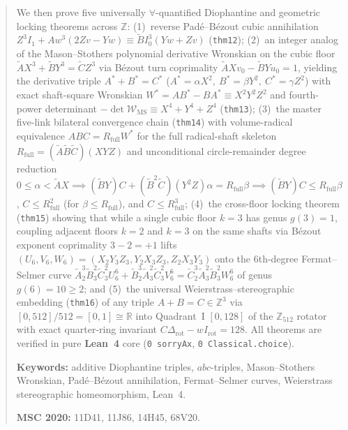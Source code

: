 \documentclass[11pt,a4paper]{article}
\theoremstyle{plain}
\theoremstyle{definition}
\begin{document}
\begin{abstract}
We then prove five universally $\forall$-quantified Diophantine and geometric locking theorems across $\mathbb{Z}$:
(1)~reverse Pad\'e--B\'ezout cubic annihilation $Z^3 I_1 + A w^3(2Zv-Yw) \equiv \widetilde{B} I_0^3(Yw+Zv)$ (\texttt{thm12});
(2)~an integer analog of the Mason--Stothers polynomial derivative Wronskian on the cubic floor $\widetilde{A}X^3+\widetilde{B}Y^3=\widetilde{C}Z^3$ via B\'ezout turn coprimality $\widetilde{A}Xv_0-\widetilde{B}Yu_0=1$, yielding the derivative triple $A^*+B^*=C^*$ ($A^*=\alpha X^2,\ B^*=\beta Y^2,\ C^*=\gamma Z^2$) with exact shaft-square Wronskian $W^* = A B^* - B A^* \equiv X^2 Y^2 Z^2$ and fourth-power determinant $-\det\mathcal{W}_{\mathrm{MS}} \equiv X^4 + Y^4 + Z^4$ (\texttt{thm13});
(3)~the master five-link bilateral convergence chain (\texttt{thm14}) with volume-radical equivalence $A B C = R_{\mathrm{full}} W^*$ for the full radical-shaft skeleton $R_{\mathrm{full}} = (\widetilde{A}\widetilde{B}\widetilde{C})(X Y Z)$ and unconditional circle-remainder degree reduction $0\le\alpha < \widetilde{A}X \implies (\widetilde{B}Y)C + (\widetilde{B}^2\widetilde{C})(Y^2 Z)\alpha = R_{\mathrm{full}}\beta \implies (\widetilde{B}Y)C \le R_{\mathrm{full}}\beta$, $C\le R_{\mathrm{full}}^2$ (for $\beta\le R_{\mathrm{full}}$), and $C\le R_{\mathrm{full}}^3$;
(4)~the cross-floor locking theorem (\texttt{thm15}) showing that while a single cubic floor $k=3$ has genus $g(3)=1$, coupling adjacent floors $k=2$ and $k=3$ on the same shafts via B\'ezout exponent coprimality $3-2=+1$ lifts $(U_6,V_6,W_6) = (X_2 Y_3 Z_3, Y_2 X_3 Z_3, Z_2 X_3 Y_3)$ onto the 6th-degree Fermat--Selmer curve $\widetilde{A}_2^3\widetilde{B}_3^2\widetilde{C}_3^2 U_6^6 + \widetilde{B}_2^3\widetilde{A}_3^2\widetilde{C}_3^2 V_6^6 = \widetilde{C}_2^3\widetilde{A}_3^2\widetilde{B}_3^2 W_6^6$ of genus $g(6)=10\ge 2$; and
(5)~the universal Weierstrass--stereographic embedding (\texttt{thm16}) of any triple $A+B=C\in\mathbb{Z}^3$ via $[0,512]/512 = [0,1]\cong\mathbb{R}$ into Quadrant~I $[0,128]$ of the $\mathbb{Z}_{512}$ rotator with exact quarter-ring invariant $C\Delta_{\mathrm{rot}} - w I_{\mathrm{rot}} = 128$. All theorems are verified in pure \textbf{Lean~4} core (\texttt{0 sorryAx}, \texttt{0 Classical.choice}).

\medskip\noindent
\textbf{Keywords:} additive Diophantine triples, $abc$-triples, Mason--Stothers Wronskian, Pad\'e--B\'ezout annihilation, Fermat--Selmer curves, Weierstrass stereographic homeomorphism, Lean~4.

\smallskip\noindent
\textbf{MSC 2020:} 11D41, 11J86, 14H45, 68V20.
\end{abstract}
\end{document}
